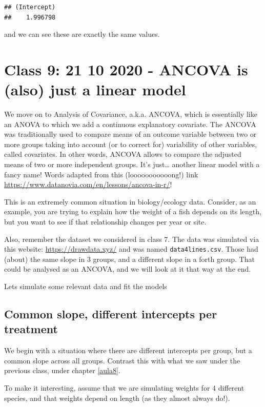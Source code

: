 \documentclass[
]{book}
\begin{document}
\begin{verbatim}
## (Intercept) 
##    1.996798
\end{verbatim}

and we can see these are exactly the same values.

\hypertarget{aula9}{%
\chapter{Class 9: 21 10 2020 - ANCOVA is (also) just a linear model}\label{aula9}}

We move on to Analysis of Covariance, a.k.a. ANCOVA, which is essentially like an ANOVA to which we add a continuous explanatory covariate. The ANCOVA was traditionally used to compare means of an outcome variable between two or more groups taking into account (or to correct for) variability of other variables, called covariates. In other words, ANCOVA allows to compare the adjusted means of two or more independent groups. It's just\ldots{} another linear model with a fancy name! Words adapted from this (looooooooooong!) link \url{https://www.datanovia.com/en/lessons/ancova-in-r/}!

This is an extremely common situation in biology/ecology data. Consider, as an example, you are trying to explain how the weight of a fish depends on its length, but you want to see if that relationship changes per year or site.

Also, remember the dataset we considered in class 7. The data was simulated via this website: \url{https://drawdata.xyz/} and was named \texttt{data4lines.csv}. Those had (about) the same slope in 3 groups, and a different slope in a forth group. That could be analysed as an ANCOVA, and we will look at it that way at the end.

Lets simulate some relevant data and fit the models

\hypertarget{common-slope-different-intercepts-per-treatment}{%
\section{Common slope, different intercepts per treatment}\label{common-slope-different-intercepts-per-treatment}}

We begin with a situation where there are different intercepts per group, but a common slope across all groups. Contrast this with what we saw under the previous class, under chapter \ref{aula8}.

To make it interesting, assume that we are simulating weights for 4 different species, and that weights depend on length (as they almost always do!).
\end{document}
